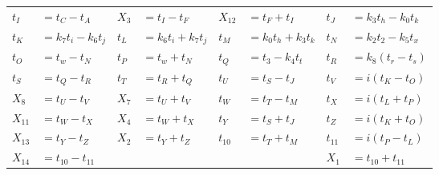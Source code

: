 \begin{tabular}{|p{4.3pt}l|p{4.3pt}l|p{4.3pt}l|p{4.3pt}l|}
$t_I $ &$= t_C - t_A$ & $X_3 $ &$= t_I - t_F$ & $X_{12} $ &$= t_F + t_I$ & $t_J $ &$= k_3t_h - k_0t_k$\\ 
$t_K $ &$= k_7t_i - k_6t_j$ & $t_L $ &$= k_6t_i + k_7t_j$ & $t_M $ &$= k_0t_h + k_3t_k$ & $t_N $ &$= k_2t_2 - k_5t_x$\\ 
$t_O $ &$= t_w - t_N$ & $t_P $ &$= t_w + t_N$ & $t_Q $ &$= t_3 - k_4t_t$ & $t_R $ &$= k_8(t_r - t_s)$\\ 
$t_S $ &$= t_Q - t_R$ & $t_T $ &$= t_R + t_Q$ & $t_U $ &$= t_S - t_J$ & $t_V $ &$= i(t_K - t_O)$\\ 
$X_8 $ &$= t_U - t_V$ & $X_7 $ &$= t_U + t_V$ & $t_W $ &$= t_T - t_M$ & $t_X $ &$= i(t_L + t_P)$\\ 
$X_{11} $ &$= t_W - t_X$ & $X_4 $ &$= t_W + t_X$ & $t_Y $ &$= t_S + t_J$ & $t_Z $ &$= i(t_K + t_O)$\\ 
$X_{13} $ &$= t_Y - t_Z$ & $X_2 $ &$= t_Y + t_Z$ & $t_{10} $ &$= t_T + t_M$ & $t_{11} $ &$= i(t_P - t_L)$\\ 
$X_{14} $ &\multicolumn{5}{l|}{$= t_{10} - t_{11}$} & $X_1 $ &$= t_{10} + t_{11}$\\ 
\bottomrule\end{tabular}
